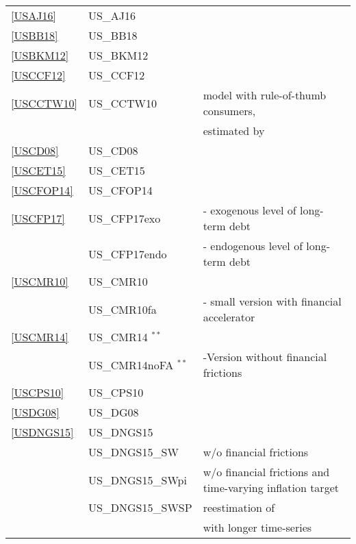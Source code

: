 \documentclass[11pt,a4paper]{article}
\begin{document}
\begin{table}[H]
\begin{tabularx}{\textwidth}{lll}
			
			\ref{USAJ16} & US\_AJ16 & \cite{ajello2016financial}\\
			\ref{USBB18} & US\_BB18 & \cite{balke2018oil}\\
			\ref{USBKM12} & US\_BKM12 & \cite{bils2012reset}\\
			\ref{USCCF12} & US\_CCF12 & \cite{chen2012macroeconomic}\\
			\ref{USCCTW10} & US\_CCTW10 & \cite{SmetsWouters2007} model with rule-of-thumb consumers,\\
			&& estimated by \cite{CoganCwikTaylorWieland2010}\\
			\ref{USCD08} & US\_CD08 & \cite{ChristensenDib2008} \\
			\ref{USCET15} & US\_CET15 & \cite{christiano2015eichenbaum}\\
			\ref{USCFOP14} & US\_CFOP14 & \cite{Carlstrometal2014}\\ 	
			\ref{USCFP17} & US\_CFP17exo & \cite{carlstrom2017targeting} - exogenous level of long-term debt\\
			& US\_CFP17endo & \cite{carlstrom2017targeting} - endogenous level of long-term debt\\
			\ref{USCMR10} & US\_CMR10 & \cite{Christianoetal2010} \\
			& US\_CMR10fa & \cite{Christianoetal2010} - small version with financial accelerator \\
			\ref{USCMR14} & US\_CMR14 $ ^{\ast \ast}$ & \cite{CMR2014}      \\  
			& US\_CMR14noFA $ ^{\ast \ast}$ & \cite{CMR2014}-Version without financial frictions        \\   
			\ref{USCPS10} & US\_CPS10 & \cite{Cogleyetal2010} \\
			
			\ref{USDG08} & US\_DG08 & \cite{DeGraeve2008} \\
			\ref{USDNGS15} & US\_DNGS15 & \cite{del2015inflation} \\
			& US\_DNGS15\_SW & \cite{del2015inflation} w/o financial frictions\\
			& US\_DNGS15\_SWpi & \cite{del2015inflation} w/o financial frictions and time-varying inflation target \\
			& US\_DNGS15\_SWSP & \cite{del2015inflation} reestimation of \cite{SmetsWouters2007} \\
			& & with longer time-series \\
			

\end{tabularx}
\end{table}
\end{document}
